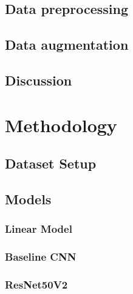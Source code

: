 \documentclass[biblatexBackend=bibtex]{tumthesis}
\begin{document}
\section{Data preprocessing}
\label{sec:dataset:data_pp}


\section{Data augmentation}
\label{sec:dataset:data_augmentation}


\section{Discussion}
\label{sec:dataset:discussion}


\chapter{Methodology}
\label{ch:methodology}


\section{Dataset Setup}
\label{sec:methodology:tfds}


\section{Models}
\label{sec:methodology:models}


\subsection{Linear Model}
\label{sec:methodology:lm}


\newpage
\subsection{Baseline CNN}
\label{sec:methodology:BL_CNN}


\subsection{ResNet50V2}
\label{sec:methodology:RN50V2}

\end{document}
